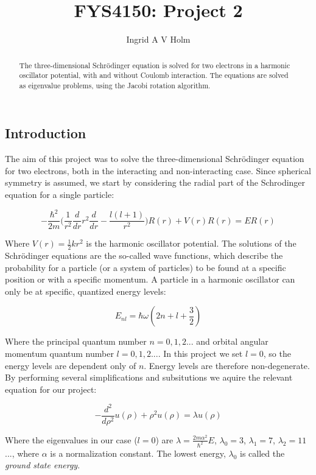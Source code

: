 \documentclass[11pt]{article}
\begin{document}
\title{FYS4150: Project 2}
\author{Ingrid A V Holm}
\maketitle

\begin{abstract}
The three-dimensional Schrödinger equation is solved for two electrons in a harmonic oscillator potential, with and without Coulomb interaction. The equations are solved as eigenvalue problems, using the Jacobi rotation algorithm.
\end{abstract}

\subsection*{Introduction}

\begin{flushleft}
The aim of this project was to solve the three-dimensional Schrödinger equation for two electrons, both in the interacting and non-interacting case. Since spherical symmetry is assumed, we start by considering the radial part of the Schrodinger equation for a single particle: 

\begin{equation}
- \frac{\hbar^2}{2 m} \Big(
\frac{1}{r^2} \frac{d}{dr} r^2 \frac{d}{dr} - \frac{l(l+1)}{r^2} \Big) R(r) + V(r)R(r) = ER(r)
\end{equation}

Where $V(r) = \frac{1}{2} kr^2$ is the harmonic oscillator potential. The solutions of the Schrödinger equations are the so-called wave functions, which describe the probability for a particle (or a system of particles) to be found at a specific position or with a specific momentum. A particle in a harmonic oscillator can only be at specific, quantized energy levels: 


\begin{equation}
E_{nl} = \hbar \omega (2n + l  + \frac{3}{2})
\end{equation}

Where the principal quantum number $n = 0,1,2...$ and orbital angular momentum quantum number $l=0,1,2...$. In this project we set $l=0$, so the energy levels are dependent only of $n$. Energy levels are therefore non-degenerate. By performing several simplifications and subsitutions we aquire the relevant equation for our project:

\begin{equation}
-\frac{d^2}{d \rho^2} u(\rho) + \rho^2 u(\rho) = \lambda u(\rho)
\end{equation}

Where the eigenvalues in our case ($l=0$) are $\lambda=\frac{2m \alpha^2}{\hbar^2}E$, $\lambda_0=3$, $\lambda_1=7$, $\lambda_2 = 11$..., where $\alpha$ is a normalization constant. The lowest energy, $\lambda_0$ is called the \textit{ground state energy}.
\end{flushleft}
\end{document}
